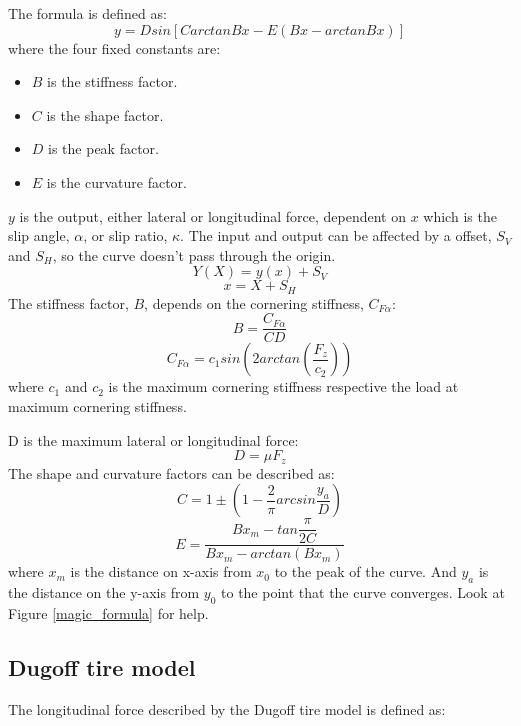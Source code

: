 The formula is defined as:
\begin{equation}
	y = Dsin[CarctanBx-E(Bx-arctanBx)]
\end{equation}
where the four fixed constants are:
\begin{itemize}
	\item $ B $ is the stiffness factor.
	\item $ C $ is the shape factor.
	\item $ D $ is the peak factor.
	\item $ E $ is the curvature factor.
\end{itemize}
$ y $ is the output, either lateral or longitudinal force, dependent on $ x $ which is the slip angle, $ \alpha $, or slip ratio, $ \kappa $. The input and output can be affected by a offset, $ S_{V} $ and $ S_{H} $, so the curve doesn't pass through the origin.
\begin{equation}
	Y(X) = y(x) + S_{V}
\end{equation}
\begin{equation}
	x = X + S_{H}
\end{equation}
The stiffness factor, $ B $, depends on the cornering stiffness, $ C_{F\alpha} $:
\begin{equation}
	B = \dfrac{C_{F\alpha}}{CD}
\end{equation}
\begin{equation}
	C_{F\alpha} = c_{1}sin(2arctan(\dfrac{F_{z}}{c_{2}}))
\end{equation}
where $ c_{1} $ and $ c_{2} $ is the maximum cornering stiffness respective the load at maximum cornering stiffness.

D is the maximum lateral or longitudinal force:
\begin{equation}
	D = \mu F_{z}
\end{equation}
The shape and curvature factors can be described as:
\begin{equation}
	C = 1 \pm (1 - \dfrac{2}{\pi}arcsin\dfrac{y_{a}}{D})
\end{equation}
\begin{equation}
	E = \dfrac{Bx_{m} - tan{\dfrac{\pi}{2C}}}{Bx_{m} - arctan(Bx_{m})}
\end{equation}
where $ x_{m} $ is the distance on x-axis from $ x_{0} $ to the peak of the curve. And $ y_{a} $ is the distance on the y-axis from $ y_{0} $ to the point that the curve converges. Look at Figure \ref{magic_formula} for help.
\subsection{Dugoff tire model}
The longitudinal force described by the Dugoff tire model is defined as:

